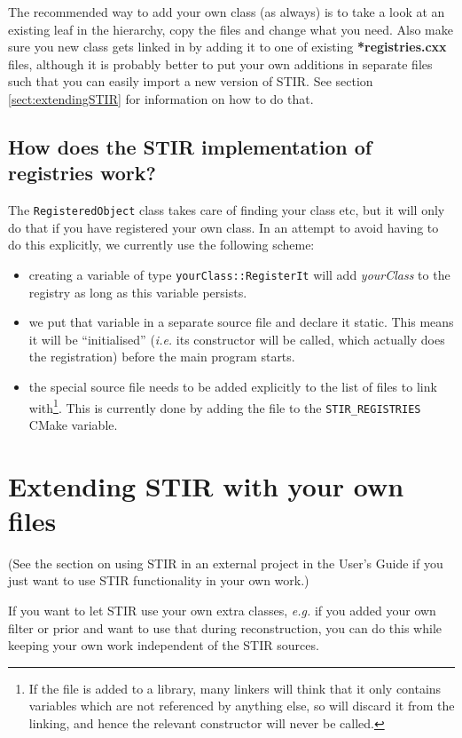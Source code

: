 \documentclass{article}
\begin{document}
The recommended way to add your own class (as always) is to take 
a look at an existing leaf in the hierarchy, copy the files and 
change what you need. Also make sure you new class gets linked 
in by adding it to one of existing \textbf{*registries.cxx} files, although
it is probably better to put your own additions in separate files
such that you can easily import a new version of STIR. 
See section \ref{sect:extendingSTIR} for information on how to do that.

\subsection{How does the STIR implementation of registries work?}
The \texttt{RegisteredObject} class takes care of finding your class etc, but it
will only do that if you have registered your own class. In an attempt to 
avoid having to do this explicitly, we currently use the following scheme:
\begin{itemize}
\item creating a variable of type \texttt{yourClass::RegisterIt} will add \textit{yourClass}
to the registry as long as this variable persists.
\item we put that variable in a separate source file and declare it static. This means it
will be ``initialised'' (\textit{i.e.} its constructor will be called, which actually does the
registration) before the main program starts.
\item the special source file needs to be added explicitly to the list of files to link with\footnote{
If the file is added to a library, many linkers will think that it only contains variables which are
not referenced by anything else, so will discard it from the linking, and hence the relevant 
constructor will never be called.}. This is currently done by adding the file to the 
\texttt{STIR\_REGISTRIES} CMake variable.
\end{itemize}

\section{
Extending STIR with your own files \label{sect:extendingSTIR}}
(See the section on using STIR in an external project in the User's Guide if you just want to
use STIR functionality in your own work.)

If you want to let STIR use your own
extra classes, \textit{e.g.} if you
added your own filter or prior and want to use that during reconstruction,
you can do this while keeping your own work independent of the STIR sources.
\end{document}
